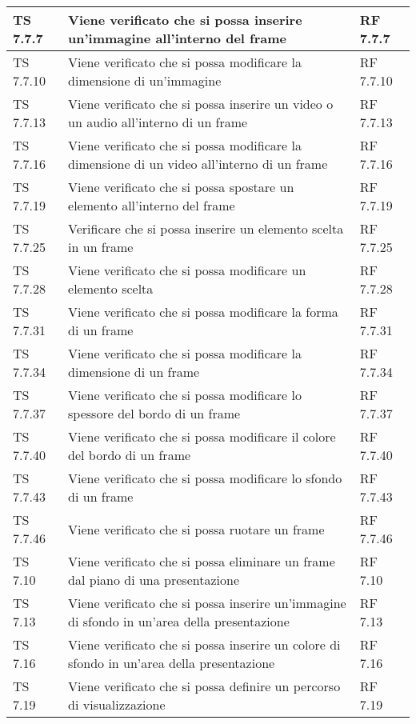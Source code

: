 {{\begin{longtable} [c]{| p{3cm} | p{6cm} |p{3cm}|}
			\hline
			TS 7.7.7 & Viene verificato che si possa inserire un'immagine all'interno del frame\ped{g} & RF 7.7.7\\
			\hline
			TS 7.7.10 & Viene verificato che si possa modificare la dimensione di un'immagine & RF 7.7.10\\
			\hline
			TS 7.7.13 & Viene verificato che si possa inserire un video o un audio all'interno di un frame\ped{g} & RF 7.7.13\\
			\hline
			TS 7.7.16 & Viene verificato che si possa modificare la dimensione di un video all'interno di un frame\ped{g} & RF 7.7.16\\
			\hline
			TS 7.7.19 & Viene verificato che si possa spostare un elemento all'interno del frame\ped{g} & RF 7.7.19\\
			\hline
			TS 7.7.25 & Verificare che si possa inserire un elemento scelta\ped{g} in un frame & RF 7.7.25\\
			\hline
			TS 7.7.28 & Viene verificato che si possa modificare un elemento scelta & RF 7.7.28\\
			\hline
			TS 7.7.31 & Viene verificato che si possa modificare la forma di un frame\ped{g} & RF 7.7.31\\
			\hline
			TS 7.7.34 & Viene verificato che si possa modificare la dimensione di un frame & RF 7.7.34\\
			\hline
			TS 7.7.37 & Viene verificato che si possa modificare  lo spessore del bordo di un frame\ped{g} & RF 7.7.37\\
			\hline
			TS 7.7.40 & Viene verificato che si possa modificare il colore del bordo di un frame\ped{g} & RF 7.7.40\\
			\hline
			TS 7.7.43 & Viene verificato che si possa modificare lo sfondo di un frame\ped{g} & RF 7.7.43\\
			\hline
			TS 7.7.46 & Viene verificato che si possa ruotare un frame & RF 7.7.46 \\
			\hline
			TS 7.10 & Viene verificato che si possa eliminare un frame\ped{g} dal piano di una presentazione & RF 7.10\\
			\hline
			TS 7.13 & Viene verificato che si possa inserire un'immagine di sfondo in un'area della presentazione & RF 7.13 \\
			\hline
			TS 7.16 & Viene verificato che si possa inserire un colore di sfondo in un'area della presentazione & RF 7.16\\
			\hline
			TS 7.19 & Viene verificato che si possa definire un percorso\ped{g} di visualizzazione & RF 7.19\\

\end{longtable}}}

